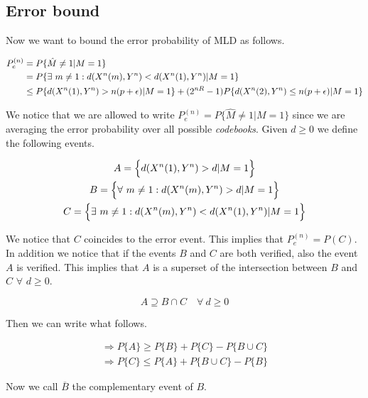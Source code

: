 \subsection{Error bound}

Now we want to bound the error probability of MLD as follows.

\begin{equation}
	\begin{aligned}
	P_e^{(n)} & =P\{\hat{M}\neq 1 | M = 1\} \\
	& = P \{ \exists \ m \neq 1 : d(X^n(m),Y^n) < d(X^n(1),Y^n) | M=1 \}\\
	& \leq P \{ d(X^n(1),Y^n) >n(p+\epsilon)|M=1\}+(2^{nR}-1)P \{ d(X^n(2),Y^n) \leq n(p+\epsilon)|M=1\}
	\end{aligned}
	\label{eq:3.5bound}
\end{equation}

We notice that we are allowed to write $P_e^{(n)}  =P \{\hat{M}\neq 1 | M = 1\}$ since we are averaging the error probability over all possible \textit{codebooks}. Given $d \geq 0$ we define the following events.

\begin{gather*}
	A = \Big \{ d(X^n(1),Y^n)>d | M = 1\Big \} \\
	B = \Big \{ \forall \  m \neq 1 : d(X^n(m),Y^n)>d | M=1 \Big \} \\
 	C = \Big\{ \exists \ m \neq 1 : d(X^n(m),Y^n) < d(X^n(1),Y^n) | M=1 \Big \}
\end{gather*}

We notice that $C$ coincides to the error event. This implies that $P_e^{(n)}=P(C)$. In addition we notice that if the events $B$ and $C$ are both verified, also the event $A$ is verified. This implies that $A$ is a superset of the intersection between $B$ and $C$ $\forall$ $d \geq 0$.

\begin{equation}
		A \supseteq B \cap C \quad \forall \  d\geq0
	\label{eq:3.5condition}
\end{equation}

Then we can write what follows.

\begin{equation}
	\begin{gathered}
		\Rightarrow P \{ A \} \geq P\{B\}+P\{C \} - P \{ B \cup C \} \\
		\Rightarrow P \{ C \} \leq P \{ A \} + P \{ B \cup C \} - P\{B \}
	\end{gathered}
\end{equation}

Now we call $\overline{B}$ the complementary event of  $B$.


